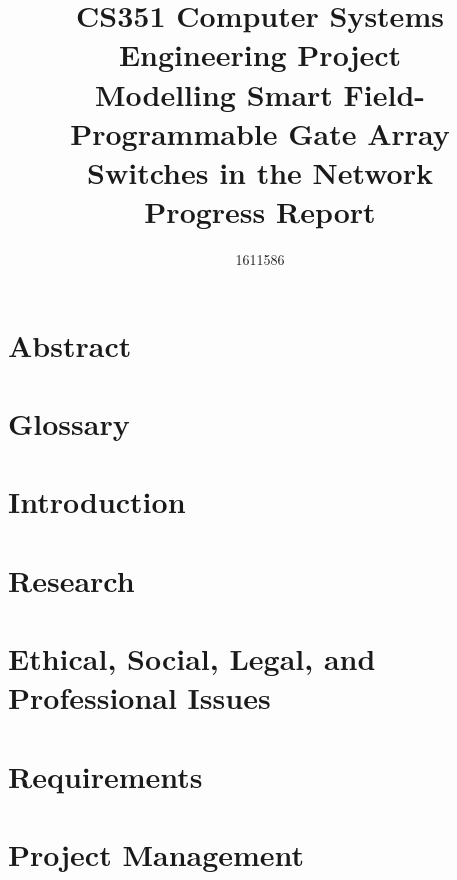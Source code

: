 \documentclass[12pt, a4paper, twoside, onecolumn, bibliography=totoc]{scrreprt}
\title{CS351 Computer Systems Engineering Project \\ \vspace{0.5cm} Modelling Smart Field-Programmable Gate Array Switches in the Network \\ \vspace{0.3cm} \Large{Progress Report}}
\author{1611586}
\begin{document}
\renewcommand{\sfdefault}{cmr}






%   

{}
{}
\chapter*{Abstract}



\tableofcontents

\listoffigures

\listoftables

\newpage


\chapter{Glossary}
\label{glossary}


\chapter{Introduction}
\label{introduction}


\chapter{Research}
\label{research}


\chapter{Ethical, Social, Legal, and Professional Issues}
\label{issues}


\chapter{Requirements}
\label{requirements}


\chapter{Project Management}
\label{project_management}

\end{document}
